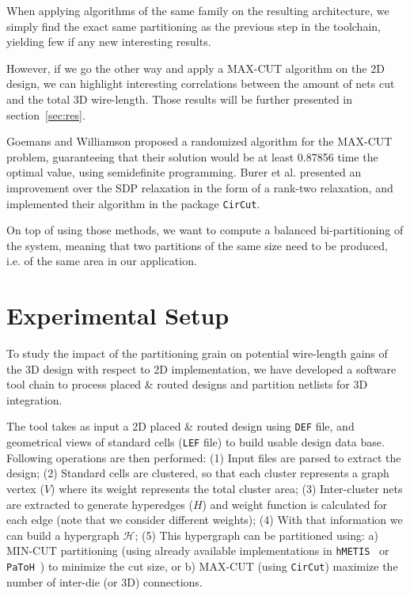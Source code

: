 \documentclass[conference]{IEEEtran}
\begin{document}
When applying algorithms of the same family on the resulting architecture, we simply find the exact same partitioning as the previous step in the toolchain, yielding few if any new interesting results.

However, if we go the other way and apply a MAX-CUT algorithm on the 2D design, we can highlight interesting correlations between the amount of nets cut and the total 3D wire-length.
Those results will be further presented in section~\ref{sec:res}.


Goemans and Williamson \cite{Goemans1995} proposed a randomized algorithm for the MAX-CUT problem, guaranteeing that their solution would be at least 0.87856 time the optimal value, using semidefinite programming. Burer et al. \cite{Burer2000} presented an improvement over the SDP relaxation in the form of a rank-two relaxation, and implemented their algorithm in the package \texttt{CirCut}.

On top of using those methods, we want to compute a balanced bi-partitioning of the system, meaning that two partitions of the same size need to be produced, i.e. of the same area in our application.

\section{Experimental Setup}\label{sec:setup}
To study the impact of the partitioning grain on potential wire-length gains of the 3D design with respect to 2D implementation, we have developed a software tool chain to process placed \& routed designs and partition netlists for 3D integration. 

The tool takes as input a 2D placed \& routed design using \texttt{DEF} file, and geometrical views of standard cells (\texttt{LEF} file) to build usable design data base. Following operations are then performed: (1) Input files are parsed to extract the design; (2) Standard cells are clustered, so that each cluster represents a graph vertex ($V$) where its weight represents the total cluster area; (3) Inter-cluster nets are extracted to generate hyperedges ($H$) and weight function is calculated for each edge (note that we consider different weights); (4) With that information we can build a hypergraph $\mathcal{H}$; (5) This hypergraph can be partitioned using: a) MIN-CUT partitioning (using already available implementations in \texttt{hMETIS}~\cite{Karypis1999} or \texttt{PaToH}~\cite{Aykanat2011}) to minimize the cut size, or b) MAX-CUT (using \texttt{CirCut}) maximize the number of inter-die (or 3D) connections.
\end{document}
